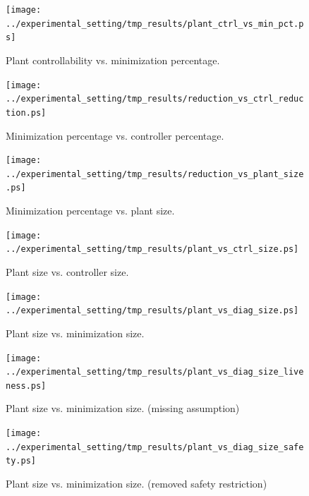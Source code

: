 \begin{figure}[bt]
	\centering
	\SmallPicture
	\texttt{[image: ../experimental\_setting/tmp\_results/plant\_ctrl\_vs\_min\_pct.ps]}
	\vspace*{-2mm}
	\caption{Plant controllability vs. minimization percentage.}
	\label{fig:plant_ctr_vs_min_pct}
	\vspace*{-4mm}
	\MediumPicture
\end{figure}
\begin{figure}[bt]
	\centering
	\SmallPicture
	\texttt{[image: ../experimental\_setting/tmp\_results/reduction\_vs\_ctrl\_reduction.ps]}
	\vspace*{-2mm}
	\caption{Minimization percentage vs. controller percentage.}
	\label{fig:min_reduction_vs_controller_reduction}
	\vspace*{-4mm}
	\MediumPicture
\end{figure}
\begin{figure}[bt]
	\centering
	\SmallPicture
	\texttt{[image: ../experimental\_setting/tmp\_results/reduction\_vs\_plant\_size.ps]}
	\vspace*{-2mm}
	\caption{Minimization percentage vs. plant size.}
	\label{fig:plant_size_vs_min_pct}
	\vspace*{-4mm}
	\MediumPicture
\end{figure}
\begin{figure}[bt]
	\centering
	\SmallPicture
	\texttt{[image: ../experimental\_setting/tmp\_results/plant\_vs\_ctrl\_size.ps]}
	\vspace*{-2mm}
	\caption{Plant size vs. controller size.}
	\label{fig:plant_vs_ctrl_size}
	\vspace*{-4mm}
	\MediumPicture
\end{figure}
\begin{figure}[bt]
	\centering
	\SmallPicture
	\texttt{[image: ../experimental\_setting/tmp\_results/plant\_vs\_diag\_size.ps]}
	\vspace*{-2mm}
	\caption{Plant size vs. minimization size.}
	\label{fig:plant_vs_diag_size}
	\vspace*{-4mm}
	\MediumPicture
\end{figure}
\begin{figure}[bt]
	\centering
	\SmallPicture
	\texttt{[image: ../experimental\_setting/tmp\_results/plant\_vs\_diag\_size\_liveness.ps]}
	\vspace*{-2mm}
	\caption{Plant size vs. minimization size. (missing assumption)}
	\label{fig:plant_vs_diag_size_liveness}
	\vspace*{-4mm}
	\MediumPicture
\end{figure}
\begin{figure}[bt]
	\centering
	\SmallPicture
	\texttt{[image: ../experimental\_setting/tmp\_results/plant\_vs\_diag\_size\_safety.ps]}
	\vspace*{-2mm}
	\caption{Plant size vs. minimization size. (removed safety restriction)}
	\label{fig:plant_vs_diag_size_safety}
	\vspace*{-4mm}
	\MediumPicture
\end{figure}

